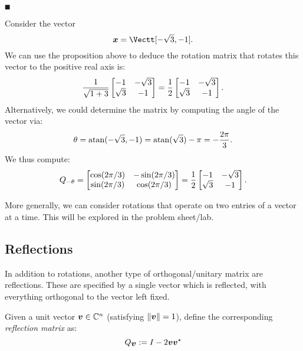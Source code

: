 \ensuremath{\QED}

\begin{example} Consider the vector
\[
\ensuremath{\bm{\x}} = \Vectt[-\sqrt{3},-1].
\]
We can use the proposition above to deduce the rotation matrix that rotates this vector to the positive real axis is:
\[
{1 \over \sqrt{1+3}} \begin{bmatrix} -1 & -\sqrt{3} \\ \sqrt{3} & -1 \end{bmatrix} = 
{1 \over 2} \begin{bmatrix} -1 & -\sqrt{3} \\ \sqrt{3} & -1 \end{bmatrix}.
\]
Alternatively, we could determine the matrix by computing the angle of the vector via:
\[
\ensuremath{\theta} =  {\rm atan}(-\sqrt{3}, -1) = {\rm atan}(\sqrt{3}) - \ensuremath{\pi} = -{2\ensuremath{\pi} \over 3}.
\]
We thus compute:
\[
Q_{-\ensuremath{\theta}} = \begin{bmatrix}
\cos(2\ensuremath{\pi}/3) & -\sin(2\ensuremath{\pi}/3) \\
\sin(2\ensuremath{\pi}/3) & \cos(2\ensuremath{\pi}/3)
\end{bmatrix} = {1 \over 2} \begin{bmatrix} -1 & -\sqrt{3} \\ \sqrt{3} & -1 \end{bmatrix}.
\]
\end{example}

More generally, we can consider rotations that operate on two entries of a vector at a time. This will be explored in the problem sheet/lab.

\subsection{Reflections}
In addition to rotations, another type of orthogonal/unitary matrix are reflections. These are specified by a single vector which is reflected, with everything orthogonal to the vector left fixed. 

\begin{definition}  Given a unit vector $\bm{{\mbox{\boldmath$v$\unboldmath}}} \in {\mathbb C}^n$ (satisfying $\|\bm{{\mbox{\boldmath$v$\unboldmath}}}\|=1$), define the corresponding \emph{reflection matrix} as:
\[
Q_{\bm{{\mbox{\boldmath$v$\unboldmath}}}} := I - 2 \bm{{\mbox{\boldmath$v$\unboldmath}}} \bm{{\mbox{\boldmath$v$\unboldmath}}}^\star
\]
\end{definition}

